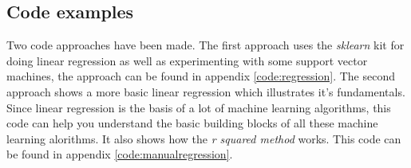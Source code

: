 \subsection{Code examples}
Two code approaches have been made. The first approach uses the \emph{sklearn} kit for doing linear regression as well as experimenting with some support vector machines, the approach can be found in appendix \ref{code:regression}. The second approach shows a more basic linear regression which illustrates it's fundamentals. Since linear regression is the basis of a lot of machine learning algorithms, this code can help you understand the basic building blocks of all these machine learning alorithms. It also shows how the \emph{r squared method} works. This code can be found in appendix \ref{code:manualregression}.
